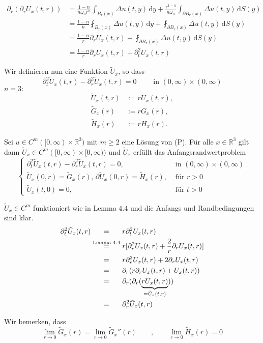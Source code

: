 \begin{beweis}
\begin{align*}
	\partial_r ( \partial_r U_x(t,r)) &= \frac{1-n}{n \omega_n r^n} \int_{B_r(x)}^{} \Delta u(t,y) \,\mathrm{d}y 
	+ \frac{r^{1-n}}{n \omega_n} \int_{\partial B_r(x)}^{} \Delta u(t,y) \,\mathrm{d}S(y) \\
	&= \frac{1-n}{n} \fint_{B_r(x)}^{} \Delta u(t,y) \,\mathrm{d}y + \fint_{\partial B_r(x)}^{} \Delta u(t,y) \,\mathrm{d}S(y) \\
	&= \frac{1-n}{r} \partial_r U_x(t,r) + \fint_{\partial B_r(x)}^{} \Delta u(t,y) \,\mathrm{d}S(y) \\
	&= \frac{1-n}{r} \partial_r U_x(t,r) + \partial_t^2 U_x(t,r)
\end{align*}
\end{beweis}
Wir definieren nun eine Funktion $\tilde U_x$, so dass
\[
	\partial_t^2 \tilde U_x(t,r) - \partial_r^2 \tilde U_x(t,r) = 0 \qquad \text{ in } (0,\infty) \times (0,\infty)
\]
$n=3:$
\begin{align*}
	\tilde U_x(t,r) &:= r U_x(t,r), \\
	\tilde G_x(r) &:= r G_x(r), \\
	\tilde H_x(r) &:= r H_x(r).
\end{align*}
\begin{korollar}
	Sei $u \in C^m([0,\infty)\times \mathbb{R}^3)$ mit $m \geq 2$ eine Lösung von (P). Für alle $x \in \mathbb{R}^3$ gilt dann $ \tilde U_x \in C^m([0,\infty) \times [0, \infty))$ und $\tilde U_x$ erfüllt das Anfangsrandwertproblem
	\[
		\begin{cases}
			\partial_t^2 \tilde U_x(t,r) - \partial^2_r \tilde U_x(t,r)=0, &\text{ in }(0, \infty) \times (0, \infty)\\
			\tilde U_x(0,r) = \tilde G_x(r), \, \partial \tilde U_x(0,r) = \tilde H_x(r), &\text{ für }r >0 \\
			\tilde U_x(t,0) = 0 , &\text{ für }t>0
		\end{cases}
	\]
\end{korollar}
\begin{beweis}
	$\tilde U_x \in C^m$ funktioniert wie in Lemma $4.4$ und die Anfangs und Randbedingungen sind klar.
	\begin{align*}
			\partial^2_t \tilde U_x(t,r) & \stackrel{\hphantom{\text{Lemma }4.4}}{=} r \partial_t^2 U_x(t,r) \\
			&\stackrel{\text{Lemma }4.4}{=} r [ \partial_r^2 U_x(t,r) + \frac{2}{r} \partial_r U_x(t,r)] \\
			& \stackrel{\hphantom{\text{Lemma }4.4}}{=} r \partial_r^2 U_x(t,r) + 2 \partial_rU_x(t,r) \\
			& \stackrel{\hphantom{\text{Lemma }4.4}}{=} \partial_r(r \partial_r U_x(t,r)+ U_x(t,r)) \\
			& \stackrel{\hphantom{\text{Lemma }4.4}}{=} \partial_r (\partial_r (\underset{= \tilde U_x(t,r)}{\underbrace{r U_x(t,r)}})) \\
			& \stackrel{\hphantom{\text{Lemma }4.4}}{=} \partial_r^2 \tilde U_x(t,r)
	\end{align*}
\end{beweis}
Wir bemerken, dass 
\[
	\lim_{r \to 0} \tilde G_x(r) = \lim_{r \to 0} \tilde G_x''(r) \qquad , \qquad \lim_{r \to 0} \tilde H_x(r) = 0
\]

